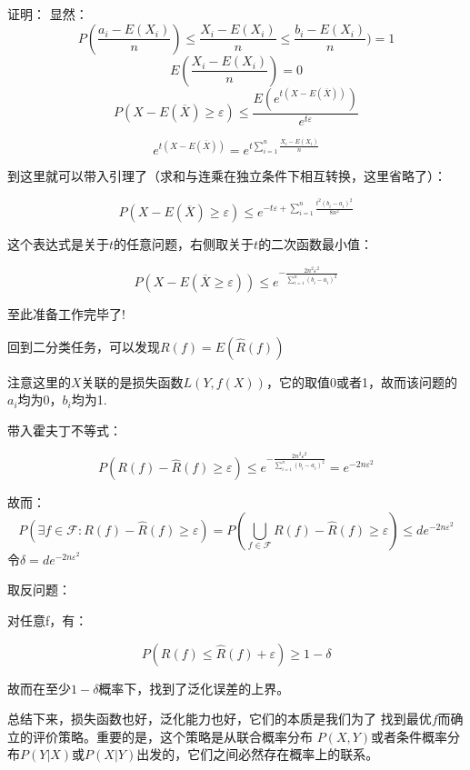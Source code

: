 \documentclass{article}
\begin{document}
证明：
显然：
\[P(\frac{a_i-E(X_i)}{n})\le \frac{X_i-E(X_i)}{n}\le \frac{b_i-E(X_i)}{n})=1\]
\[E(\frac{X_i-E(X_i)}{n})=0\]
\[P(X-E(\overline{X}) \ge \varepsilon ) \le \frac{E(e^{t(X-E(\overline{X}))})}{e^{t\varepsilon }}\]

\[e^{t(X-E(\overline{X}))}=e^{t\sum_{i=1}^{n}\frac{X_i-E(X_i)}{n}}\]

到这里就可以带入引理了（求和与连乘在独立条件下相互转换，这里省略了）：

\[P(X-E(\overline{X})\ge \varepsilon) \le e^{-t\varepsilon +\sum_{i=1}^{n}\frac{t^2(b_i-a_i)^2}{8n^2}}\]

这个表达式是关于$t$的任意问题，右侧取关于$t$的二次函数最小值：

\[P(X-E(\overline{X}\ge \varepsilon ))\le e^{-\frac{2n^2\varepsilon ^2}{\sum_{i=1}^{n}(b_i-a_i)^2}}\]


至此准备工作完毕了!

回到二分类任务，可以发现$R(f)=E(\widehat{R}(f))$

注意这里的$X$关联的是损失函数$L(Y,f(X))$，它的取值0或者1，故而该问题的$a_i$均为0，$b_i$均为1.

带入霍夫丁不等式：

\[P(R(f)-\widehat{R}(f)\ge \varepsilon )\le e^{-\frac{2n^2\varepsilon ^2}{\sum_{i=1}^{n}(b_i-a_i)^2}}=e^{-2n\varepsilon ^2}\]

故而：
\[P(\exists f\in \mathcal{F} :R(f)-\widehat{R}(f)\ge \varepsilon )
= P(\bigcup_{f\in \mathcal{F}}R(f)-\widehat{R}(f)\ge \varepsilon )
\le de^{-2n\varepsilon ^2} \]
令$\delta=de^{-2n\varepsilon ^2} $

取反问题：

对任意f，有：

\[P(R(f) \le \widehat{R}(f)+\varepsilon )\ge 1-\delta \]

故而在至少$1-\delta $概率下，找到了泛化误差的上界。

总结下来，损失函数也好，泛化能力也好，它们的本质是我们为了
找到最优$f$而确立的评价策略。重要的是，这个策略是从联合概率分布
$P(X,Y)$或者条件概率分布$P(Y|X)$或$P(X|Y)$出发的，它们之间必然存在概率上的联系。
\end{document}
